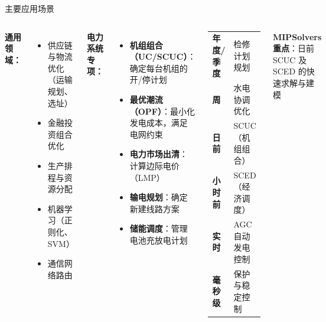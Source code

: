 \documentclass[10pt,aspectratio=169]{beamer}
\begin{document}
\begin{frame}{主要应用场景}
  \begin{columns}[T]
    \textbf{通用领域：}
    \begin{itemize}
      \item 供应链与物流优化（运输规划、选址）
      \item 金融投资组合优化
      \item 生产排程与资源分配
      \item 机器学习（正则化、SVM）
      \item 通信网络路由
    \end{itemize}

    \vspace{8pt}
    \textbf{电力系统专项：}
    \begin{itemize}
      \item \textbf{机组组合（UC/SCUC）}：确定每台机组的开/停计划
      \item \textbf{最优潮流（OPF）}：最小化发电成本，满足电网约束
      \item \textbf{电力市场出清}：计算边际电价（LMP）
      \item \textbf{输电规划}：确定新建线路方案
      \item \textbf{储能调度}：管理电池充放电计划
    \end{itemize}

    \begin{tcolorbox}[mybox,title=电力系统调度层级]
      \footnotesize
      \begin{tabular}{@{}ll@{}}
        \textbf{年度/季度} & 检修计划规划 \\[2pt]
        \textbf{周}        & 水电协调优化 \\[2pt]
        \textbf{日前}      & SCUC（机组组合）\\[2pt]
        \textbf{小时前}    & SCED（经济调度）\\[2pt]
        \textbf{实时}      & AGC自动发电控制 \\[2pt]
        \textbf{毫秒级}    & 保护与稳定控制 \\
      \end{tabular}
    \end{tcolorbox}

    \vspace{6pt}
    \textbf{MIPSolvers 重点}：日前 SCUC 及 SCED 的快速求解与建模
  \end{columns}
\end{frame}
\end{document}
